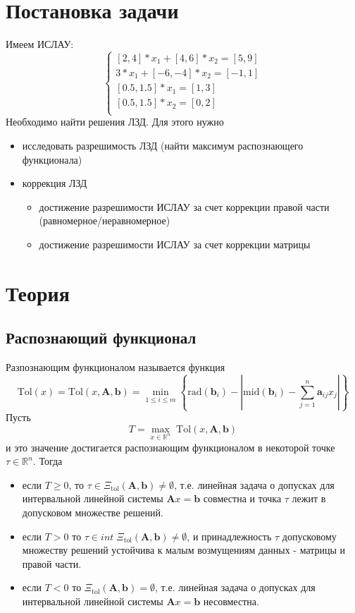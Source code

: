 \documentclass[a4paper,12pt]{article}
\begin{document}
\section{Постановка задачи}
Имеем ИСЛАУ:
\begin{equation*}
 \begin{cases}
   [2, 4]*x_1 + [4,6]*x_2 = [5, 9]\\
   3*x_1 + [-6, -4]*x_2 = [-1, 1]\\
   [0.5, 1.5]*x_1 = [1, 3]\\
  [0.5, 1.5]*x_2 = [0, 2]\\
 \end{cases}
\end{equation*}
Необходимо найти решения ЛЗД. Для этого нужно
\begin{itemize}
    \item исследовать разрешимость ЛЗД (найти максимум распознающего функционала)
    \item коррекция ЛЗД
    \begin{itemize}
        \item достижение разрешимости ИСЛАУ за счет коррекции правой части (равномерное/неравномерное)
        \item достижение разрешимости ИСЛАУ за счет коррекции матрицы
    \end{itemize}
\end{itemize}


\section{Теория}
\subsection{Распознающий функционал}
Разпознающим функционалом называется функция
\begin{equation}
    \mathrm{Tol}(x)=\mathrm{Tol}(x,\mathbf{A},\mathbf{b})=\min_{1\leq i\leq m}\left\{\mathrm{rad}(\mathbf{b}_i)-\left|\mathrm{mid}(\mathbf{b}_i)-\sum_{j=1}^n \mathbf{a}_{ij}x_j\right|\right\}
\end{equation}
Пусть
\begin{equation}
T=\max_{x\in \mathbb{R}^n} \;\mathrm{Tol}(x, \mathbf{A},\mathbf{b})
\end{equation}
и это значение достигается распознающим функционалом в некоторой точке $\tau\in \mathbb{R}^n$. Тогда
\begin{itemize}
    \item если $T\geq0$, то $\tau\in\Xi_{\mathrm{tol}}(\textbf{A},\textbf{b})\neq  \emptyset$, т.е. линейная задача о допусках для интервальной линейной системы $\textbf{A}x=\textbf{b}$ совместна и точка $\tau$ лежит в допусковом множестве решений.
    \item если $T>0$ то $\tau\in int \;\Xi_{\mathrm{tol}}(\textbf{A},\textbf{b})\neq  \emptyset$, и принадлежность $\tau$ допусковому множеству решений устойчива к малым возмущениям данных - матрицы и правой части.
    \item если $T<0$ то $\Xi_{\mathrm{tol}}(\textbf{A},\textbf{b})=\emptyset$,  т.е. линейная задача о допусках для интервальной линейной системы $\textbf{A}x=\textbf{b}$ несовместна.
\end{itemize}
\end{document}
